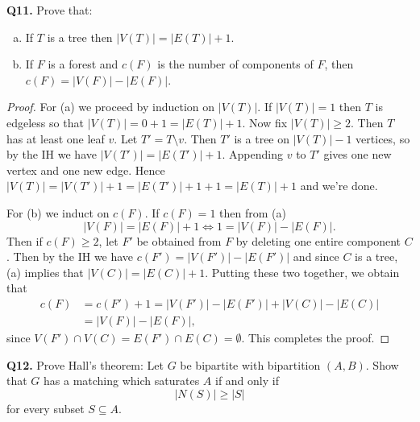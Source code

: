 \documentclass{article}
\begin{document}
\noindent \textbf{Q11.} Prove that:
\begin{enumerate}[(a)]
	\item If \( T \) is a tree then \( |V(T)| = |E(T)| + 1 \).
	\item If \( F \) is a forest and \( c(F) \) is the number of components of \( F \), then \( c(F) = |V(F)| - |E(F)| \).
\end{enumerate}
\begin{proof}
For (a) we proceed by induction on \( |V(T)| \). If \( |V(T)| = 1 \) then \( T \) is edgeless so that \( |V(T)| = 0 + 1 = |E(T)| + 1 \). Now fix \( |V(T)| \geq 2 \).  Then \( T \) has at least one leaf \( v \). Let \( T' = T \setminus v \). Then \( T' \) is a tree on \( |V(T)| - 1 \) vertices, so by the IH we have \( |V(T')| = |E(T')| + 1 \). Appending \( v \) to \( T' \) gives one new vertex and one new edge. Hence \( |V(T)| = |V(T')| + 1 = |E(T')| + 1 + 1 = |E(T)| + 1 \) and we're done.

For (b) we induct on \( c(F) \). If \( c(F) = 1 \) then from (a) \[|V(F)| = |E(F)| + 1 \Leftrightarrow   1 = |V(F)| - |E(F)|. \] Then if \( c(F) \geq 2 \), let \( F' \) be obtained from \( F \) by deleting one entire component \( C \). Then by the IH we have \( c(F') = |V(F')| - |E(F')| \) and since \( C \) is a tree, (a) implies that \( |V(C)| = |E(C)| + 1  \). Putting these two together, we obtain that
\begin{align*}
	c(F) &= c(F') + 1 = |V(F')| - |E(F')| + |V(C)| - |E(C)| \\
	     &= |V(F)| - |E(F)|, 
\end{align*}
since \( V(F') \cap V(C) = E(F') \cap E(C) = \emptyset  \). This completes the proof. 
\end{proof}
\noindent \textbf{Q12.} Prove Hall's theorem: Let \( G \) be bipartite with bipartition \( (A,B) \). Show that \( G \) has a matching which saturates \( A \) if and only if \[ |N(S)| \geq |S| \] for every subset \( S \subseteq A \).
\end{document}
